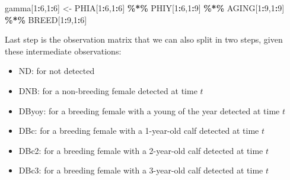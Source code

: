 \documentclass[
  12pt,
]{krantz}
\newenvironment{Shaded}{\begin{snugshade}}{\end{snugshade}}
\newcommand{\DecValTok}[1]{\textcolor[rgb]{0.00,0.00,0.81}{#1}}
\newcommand{\NormalTok}[1]{#1}
\newcommand{\OtherTok}[1]{\textcolor[rgb]{0.56,0.35,0.01}{#1}}
\newcommand{\SpecialCharTok}[1]{\textcolor[rgb]{0.81,0.36,0.00}{\textbf{#1}}}
\providecommand{\tightlist}{%
  \setlength{\itemsep}{0pt}\setlength{\parskip}{0pt}}
\begin{document}
\begin{Shaded}
\begin{Highlighting}[]
\NormalTok{gamma[}\DecValTok{1}\SpecialCharTok{:}\DecValTok{6}\NormalTok{,}\DecValTok{1}\SpecialCharTok{:}\DecValTok{6}\NormalTok{] }\OtherTok{\textless{}{-}}\NormalTok{ PHIA[}\DecValTok{1}\SpecialCharTok{:}\DecValTok{6}\NormalTok{,}\DecValTok{1}\SpecialCharTok{:}\DecValTok{6}\NormalTok{] }\SpecialCharTok{\%*\%}\NormalTok{ PHIY[}\DecValTok{1}\SpecialCharTok{:}\DecValTok{6}\NormalTok{,}\DecValTok{1}\SpecialCharTok{:}\DecValTok{9}\NormalTok{] }\SpecialCharTok{\%*\%}\NormalTok{ AGING[}\DecValTok{1}\SpecialCharTok{:}\DecValTok{9}\NormalTok{,}\DecValTok{1}\SpecialCharTok{:}\DecValTok{9}\NormalTok{] }\SpecialCharTok{\%*\%}\NormalTok{ BREED[}\DecValTok{1}\SpecialCharTok{:}\DecValTok{9}\NormalTok{,}\DecValTok{1}\SpecialCharTok{:}\DecValTok{6}\NormalTok{]}
\end{Highlighting}
\end{Shaded}

Last step is the observation matrix that we can also split in two steps, given these intermediate observations:

\begin{itemize}
\tightlist
\item
  ND: for not detected\\
\item
  DNB: for a non-breeding female detected at time \(t\)\\
\item
  DByoy: for a breeding female with a young of the year detected at time \(t\)\\
\item
  DBc: for a breeding female with a 1-year-old calf detected at time \(t\)\\
\item
  DBc2: for a breeding female with a 2-year-old calf detected at time \(t\)\\
\item
  DBc3: for a breeding female with a 3-year-old calf detected at time \(t\)
\end{itemize}
\end{document}

